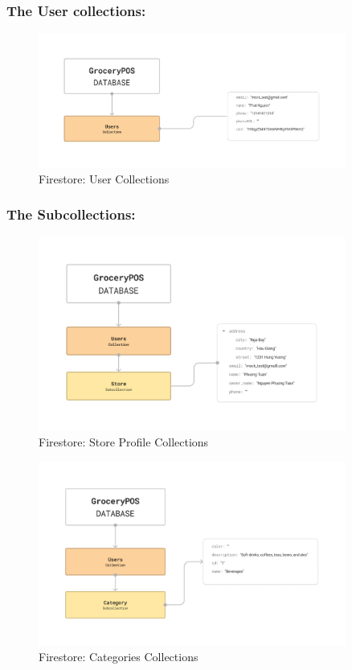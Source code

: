 \documentclass[../thesis.tex]{subfiles}
\begin{document}
\subsubsection*{The User collections:}

\begin{figure}[H]
    \centering
    \includegraphics[width=0.9\textwidth]{images/Firestore_UserCollections.png}
    \caption{Firestore: User Collections}
    \label{fig:Firestore_UserCollections}
\end{figure}

\subsubsection*{The Subcollections:}
\begin{figure}[H]
    \centering
    \includegraphics[width=0.9\textwidth]{images/Firestore_StoreCollections.png}
    \caption{Firestore: Store Profile Collections}
    \label{fig:Firestore_StoreCollections}
\end{figure}
\begin{figure}[H]
    \centering
    \includegraphics[width=0.9\textwidth]{images/Firestore_CategoryCollections.png}
    \caption{Firestore: Categories Collections}
    \label{fig:Firestore_CategoryCollections}
\end{figure}
\end{document}
